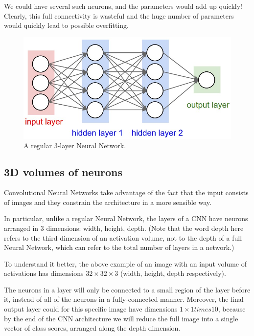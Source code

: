 \documentclass[%
oneside,                 %
final,                   %
10pt]{article}
\begin{document}
We could have
several such neurons, and the parameters would add up quickly! Clearly,
this full connectivity is wasteful and the huge number of parameters
would quickly lead to possible overfitting.


\begin{figure}[!ht]  %
  \centerline{\includegraphics[width=0.6\linewidth]{figslides/nn.jpeg}}
  \caption{
  A regular 3-layer Neural Network.
  }
\end{figure}


\subsection*{3D volumes of neurons}

Convolutional Neural Networks take advantage of the fact that the
input consists of images and they constrain the architecture in a more
sensible way. 

In particular, unlike a regular Neural Network, the
layers of a CNN have neurons arranged in 3 dimensions: width,
height, depth. (Note that the word depth here refers to the third
dimension of an activation volume, not to the depth of a full Neural
Network, which can refer to the total number of layers in a network.)

To understand it better, the above example of an image 
with an input volume of
activations has dimensions $32\times 32\times 3$ (width, height,
depth respectively). 

The neurons in a layer will
only be connected to a small region of the layer before it, instead of
all of the neurons in a fully-connected manner. Moreover, the final
output layer could  for this specific image have dimensions $1\times 1 times 10$, 
because by the
end of the CNN architecture we will reduce the full image into a
single vector of class scores, arranged along the depth
dimension. 
\end{document}
